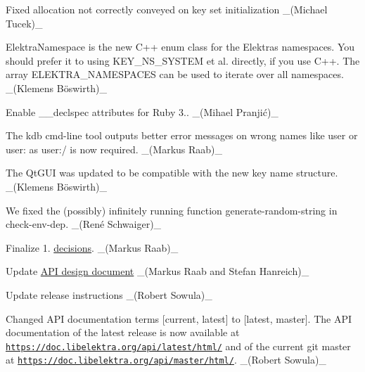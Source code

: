 \begin{DoxyItemize}
\item Fixed allocation not correctly conveyed on key set initialization \+\_\+(\+Michael Tucek)\+\_\+
\end{DoxyItemize}


\begin{DoxyItemize}
\item {\ttfamily Elektra\+Namespace} is the new C++ {\ttfamily enum class} for the Elektra\textquotesingle{}s namespaces. You should prefer it to using {\ttfamily K\+E\+Y\+\_\+\+N\+S\+\_\+\+S\+Y\+S\+T\+EM} et al. directly, if you use C++. The array {\ttfamily E\+L\+E\+K\+T\+R\+A\+\_\+\+N\+A\+M\+E\+S\+P\+A\+C\+ES} can be used to iterate over all namespaces. \+\_\+(Klemens Böswirth)\+\_\+
\end{DoxyItemize}


\begin{DoxyItemize}
\item Enable {\ttfamily \+\_\+\+\_\+declspec} attributes for Ruby 3.. \+\_\+(Mihael Pranjić)\+\_\+
\end{DoxyItemize}


\begin{DoxyItemize}
\item The kdb cmd-\/line tool outputs better error messages on wrong names like {\ttfamily user} or {\ttfamily user\+:} as {\ttfamily user\+:/} is now required. \+\_\+(\+Markus Raab)\+\_\+
\item The Qt\+G\+UI was updated to be compatible with the new key name structure. \+\_\+(Klemens Böswirth)\+\_\+
\end{DoxyItemize}


\begin{DoxyItemize}
\item We fixed the (possibly) infinitely running function {\ttfamily generate-\/random-\/string} in check-\/env-\/dep. \+\_\+(René Schwaiger)\+\_\+
\end{DoxyItemize}


\begin{DoxyItemize}
\item Finalize 1. \hyperlink{doc_decisions_README_md}{decisions}. \+\_\+(\+Markus Raab)\+\_\+
\item Update \hyperlink{doc_DESIGN_md}{A\+PI design document} \+\_\+(\+Markus Raab and Stefan Hanreich)\+\_\+
\item Update release instructions \+\_\+(\+Robert Sowula)\+\_\+
\item Changed A\+PI documentation terms \mbox{[}current, latest\mbox{]} to \mbox{[}latest, master\mbox{]}. The A\+PI documentation of the latest release is now available at \href{https://doc.libelektra.org/api/latest/html/}{\tt https\+://doc.\+libelektra.\+org/api/latest/html/} and of the current git master at \href{https://doc.libelektra.org/api/master/html/}{\tt https\+://doc.\+libelektra.\+org/api/master/html/}. \+\_\+(\+Robert Sowula)\+\_\+
\end{DoxyItemize}


